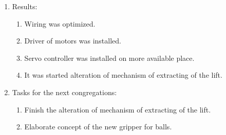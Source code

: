 \begin{enumerate}
	\item Results: 
	\begin{enumerate}
		\item Wiring was optimized.
		
		\item Driver of motors was installed.
		
		\item Servo controller was installed on more available place.
		
		\item It was started alteration of mechanism of extracting of the lift.
		
	\end{enumerate}
	
	\item Tasks for the next congregations:
	\begin{enumerate}
		\item Finish the alteration of mechanism of extracting of the lift.
		
		\item Elaborate concept of the new gripper for balls.
		
	\end{enumerate}     
\end{enumerate}
\fillpage